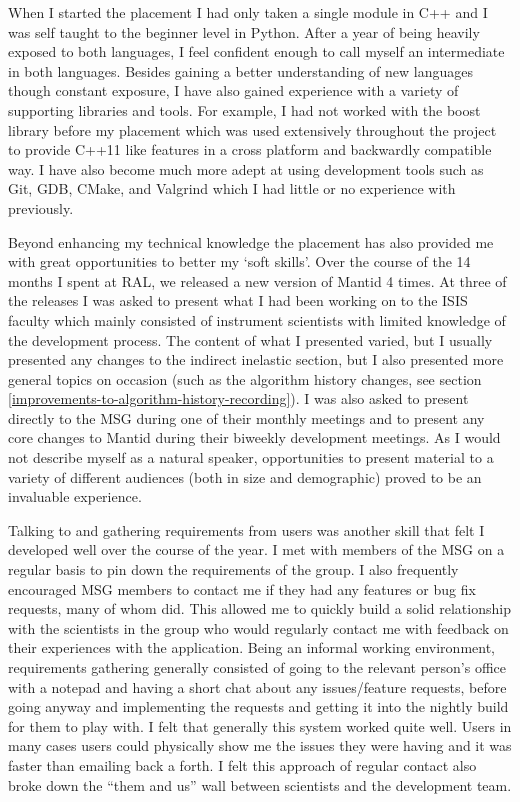 \documentclass[paper=a4, fontsize=11pt]{scrartcl}	%
\numberwithin{equation}{section}															%
\numberwithin{figure}{section}																%
\numberwithin{table}{section}
\begin{document}
When I started the placement I had only taken a single module in C++ and
I was self taught to the beginner level in Python. After a year of being
heavily exposed to both languages, I feel confident enough to call
myself an intermediate in both languages. Besides gaining a better
understanding of new languages though constant exposure, I have also
gained experience with a variety of supporting libraries and tools. For
example, I had not worked with the boost library before my placement
which was used extensively throughout the project to provide C++11 like
features in a cross platform and backwardly compatible way. I have also become much more adept at using
development tools such as Git, GDB, CMake, and Valgrind which I had
little or no experience with previously.

Beyond enhancing my technical knowledge the placement has also provided
me with great opportunities to better my `soft skills'. Over the course
of the 14 months I spent at RAL, we released a new version of Mantid 4
times. At three of the releases I was asked to present what I had been
working on to the ISIS faculty which mainly consisted of instrument
scientists with limited knowledge of the development process. The content of what I presented varied, but I usually
presented any changes to the indirect inelastic section, but I also
presented more general topics on occasion (such as the algorithm history
changes, see section
\ref{improvements-to-algorithm-history-recording}). I was also asked to present directly to
the MSG during one of their monthly meetings and to present any core
changes to Mantid during their biweekly development meetings. As I would
not describe myself as a natural speaker, opportunities to present
material to a variety of different audiences (both in size and
demographic) proved to be an invaluable experience.

Talking to and gathering requirements from users was another skill that
felt I developed well over the course of the year. I met with members of
the MSG on a regular basis to pin down the requirements of the group. I
also frequently encouraged MSG members to contact me if they had any
features or bug fix requests, many of whom did. This allowed me to
quickly build a solid relationship with the scientists in the group who
would regularly contact me with feedback on their experiences with the application. Being an informal working
environment, requirements gathering generally consisted of going to the relevant person's office with a notepad
and having a short chat about any issues/feature requests, before going
anyway and implementing the requests and getting it into the nightly
build for them to play with. I felt that generally this system worked
quite well. Users in many cases users could physically show me the
issues they were having and it was faster than emailing back a forth. I
felt this approach of regular contact also broke down the ``them and
us'' wall between scientists and the development team.
\end{document}
